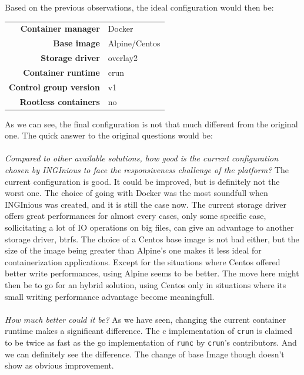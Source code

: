 Based on the previous observations, the ideal configuration would then be:

\begin{center}
\begin{tabular}{rl}
  \textbf{Container manager} & Docker \\
  \textbf{Base image} & Alpine/Centos \\
  \textbf{Storage driver} & overlay2 \\
  \textbf{Container runtime} & crun \\
  \textbf{Control group version} & v1 \\
  \textbf{Rootless containers} & no \\
\end{tabular}
\end{center}

As we can see, the final configuration is not that much different from the original one.  The quick answer to the original questions would be:
\paragraph{}\textit{Compared to other available solutions, how good is the current configuration chosen by INGInious to face the responsiveness challenge of the platform?}  The current configuration is good.  It could be improved, but is definitely not the worst one.  The choice of going with Docker was the most soundfull when INGInious was created, and it is still the case now.  The current storage driver offers great performances for almost every cases, only some specific case, sollicitating a lot of IO operations on big files, can give an advantage to another storage driver, btrfs.  The choice of a Centos base image is not bad either, but the size of the image being greater than Alpine's one makes it less ideal for containerization applications.  Except for the situations where Centos offered better write performances, using Alpine seems to be better.  The move here might then be to go for an hybrid solution, using Centos only in situations where its small writing performance advantage become meaningfull.  
\paragraph{}\textit{How much better could it be?}  As we have seen, changing the current container runtime makes a significant difference.  The c implementation of \texttt{crun} is claimed to be twice as fast as the go implementation of \texttt{runc} by \texttt{crun}'s contributors.  And we can definitely see the difference.  The change of base Image though doesn't show as obvious improvement.
